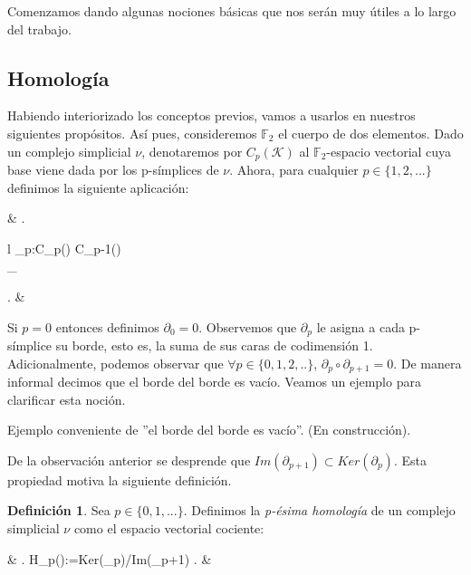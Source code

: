 \documentclass[12pt]{article}
\numberwithin{equation}{section}
\theoremstyle{definition}
\newtheorem{defi}{Definición}
\newenvironment{ejem}
  {\pushQED{\qed}\renewcommand{\qedsymbol}{$\blacktriangleleft$}\ejemplo}
  {\popQED\endejemplo}
\theoremstyle{remark}
\theoremstyle{plain}
\begin{document}
		Comenzamos dando algunas nociones básicas que nos serán muy útiles a lo largo del trabajo.
			
	\subsection{Homología}	

		Habiendo interiorizado los conceptos previos, vamos a usarlos en nuestros siguientes propósitos. Así pues, consideremos $\mathbb{F}_{2}$ el cuerpo de dos elementos. Dado un
		complejo simplicial {\Large $\nu$}, denotaremos por $C_{p}(\mathcal{K})$ al $\mathbb{F}_{2}$-espacio vectorial cuya base viene dada por los p-símplices de {\Large $\nu$}. Ahora,
		para cualquier $p \in \{1,2,...\}$ definimos la siguiente aplicación: 
		\begin{flalign*}
			& \left.
			\begin{array}{l}
				\partial_{p}:C_{p}() \rightarrow C_{p-1}()\\[2pt] 
				\hspace{1.5cm} \sigma \mapsto \displaystyle \sum_{}\tau
			\end{array}
			\right. &
		\end{flalign*}
		
		Si $p=0$ entonces definimos $\partial_{0}=0$. Observemos que $\partial_{p}$ le asigna a cada p-símplice su borde, esto es, la suma de sus caras de codimensión 1. Adicionalmente, podemos
		observar que $\forall p \in \{0,1,2,..\}$, $\partial_{p}\circ \partial_{p+1}=0$. De manera informal decimos que el borde del borde es vacío. Veamos un ejemplo para clarificar esta noción.

		\begin{ejem}
		
			Ejemplo conveniente de ''el borde del borde es vacío''. (En construcción).

		\end{ejem}

		De la observación anterior se desprende que $Im(\partial_{p+1}) \subset Ker(\partial_{p})$. Esta propiedad motiva la siguiente definición.
		\begin{defi}
			Sea $p \in \{0,1,...\}$. Definimos la \textit{p-ésima homología} de un complejo simplicial {\Large $\nu$} como el espacio vectorial cociente:	
			\begin{flalign*}
				& \left.
				H_{p}():=Ker(\partial_{p})/Im(\partial_{p+1})
				\right. &
			\end{flalign*}
		\end{defi}
\end{document}
